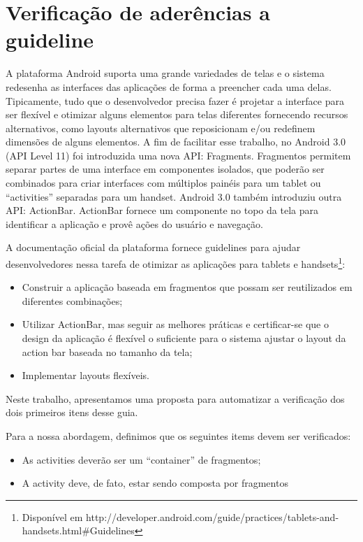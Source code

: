 \chapter{Verificação de aderências a guideline}

A plataforma Android suporta uma grande variedades de telas e o sistema redesenha
as interfaces das aplicações de forma a preencher cada uma delas. Tipicamente, 
tudo que o desenvolvedor precisa fazer é projetar a interface para ser flexível 
e otimizar alguns elementos para telas diferentes fornecendo recursos alternativos, 
como layouts alternativos que reposicionam e/ou redefinem dimensões de alguns 
elementos. A fim de facilitar esse trabalho, no Android 3.0 (API Level 11) foi 
introduzida uma nova API: Fragments. Fragmentos permitem separar partes de uma 
interface em componentes isolados, que poderão ser combinados para criar interfaces 
com múltiplos painéis para um tablet ou “activities” separadas para um handset. 
Android 3.0 também introduziu outra API: ActionBar. ActionBar fornece um componente 
no topo da tela para identificar a aplicação e provê ações do usuário e navegação.

A documentação oficial da plataforma fornece guidelines para ajudar desenvolvedores
nessa tarefa de otimizar as aplicações para tablets e handsets\footnote{Disponível 
em http://developer.android.com/guide/practices/tablets-and-handsets.html\#Guidelines}:

\begin{itemize}
    \item{Construir a aplicação baseada em fragmentos que possam ser reutilizados 
    em diferentes combinações;}
    \item{Utilizar ActionBar, mas seguir as melhores práticas e certificar-se que 
    o design da aplicação é flexível o suficiente para o sistema ajustar o layout 
    da action bar baseada no tamanho da tela;}
    \item{Implementar layouts flexíveis.}
\end{itemize}

Neste trabalho, apresentamos uma proposta para automatizar a verificação dos dois 
primeiros itens desse guia. 

Para a nossa abordagem, definimos que os seguintes items devem ser verificados: 
\begin{itemize}
    \item{As activities deverão ser um “container” de fragmentos;}
    \item{A activity deve, de fato, estar sendo composta por fragmentos}
\end{itemize}


